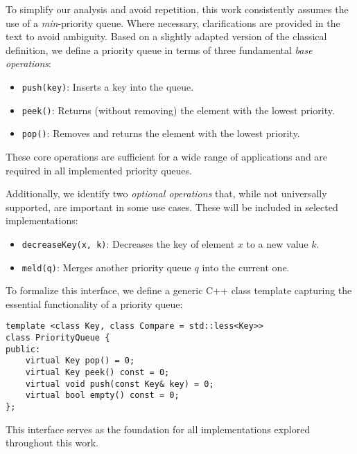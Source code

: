 To simplify our analysis and avoid repetition, this work consistently assumes the use of a \emph{min}-priority queue. Where necessary, clarifications are provided in the text to avoid ambiguity. Based on a slightly adapted version of the classical definition, we define a priority queue in terms of three fundamental \emph{base operations}:

\begin{itemize}
    \item \texttt{push(key)}: Inserts a key into the queue.
    \item \texttt{peek()}: Returns (without removing) the element with the lowest priority.
    \item \texttt{pop()}: Removes and returns the element with the lowest priority.
\end{itemize}

These core operations are sufficient for a wide range of applications and are required in all implemented priority queues.

Additionally, we identify two \emph{optional operations} that, while not universally supported, are important in some use cases. These will be included in selected implementations:

\begin{itemize}
    \item \texttt{decreaseKey(x, k)}: Decreases the key of element \( x \) to a new value \( k \).
    \item \texttt{meld(q)}: Merges another priority queue \( q \) into the current one.
\end{itemize}

To formalize this interface, we define a generic C++ class template capturing the essential functionality of a priority queue:

\begin{verbatim}
template <class Key, class Compare = std::less<Key>>
class PriorityQueue {
public:
    virtual Key pop() = 0;
    virtual Key peek() const = 0;
    virtual void push(const Key& key) = 0;
    virtual bool empty() const = 0;
};
\end{verbatim}

This interface serves as the foundation for all implementations explored throughout this work.
